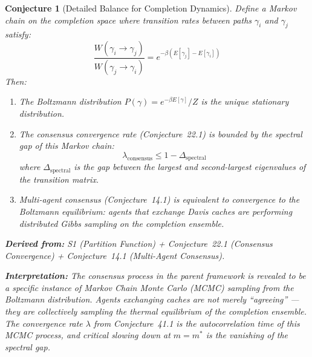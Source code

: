 \documentclass[11pt,letterpaper]{article}
\newtheorem{conjecture}{Conjecture}[section]
\begin{document}
\begin{conjecture}[Detailed Balance for Completion 
Dynamics]\label{conj:detailed_balance}
Define a Markov chain on the completion space where transition rates between 
paths $\gamma_i$ and $\gamma_j$ satisfy:
\begin{equation}\label{eq:detailed_balance}
    \frac{W(\gamma_i \to \gamma_j)}{W(\gamma_j \to \gamma_i)} 
    = e^{-\beta(E[\gamma_j] - E[\gamma_i])}
\end{equation}
Then:

\begin{enumerate}[label=(\alph*)]
    \item The Boltzmann distribution $P(\gamma) = e^{-\beta E[\gamma]} / Z$ 
    is the unique stationary distribution.
    
    \item The consensus convergence rate (Conjecture~22.1) is bounded by 
    the spectral gap of this Markov chain:
    \begin{equation}\label{eq:consensus_spectral}
        \lambda_{\mathrm{consensus}} \leq 1 - \Delta_{\mathrm{spectral}}
    \end{equation}
    where $\Delta_{\mathrm{spectral}}$ is the gap between the largest and 
    second-largest eigenvalues of the transition matrix.
    
    \item Multi-agent consensus (Conjecture~14.1) is equivalent to 
    convergence to the Boltzmann equilibrium: agents that exchange Davis 
    caches are performing distributed Gibbs sampling on the completion 
    ensemble.
\end{enumerate}

\textbf{Derived from:} S1 (Partition Function) + Conjecture~22.1 
(Consensus Convergence) + Conjecture~14.1 (Multi-Agent Consensus).

\textbf{Interpretation:} The consensus process in the parent framework 
is revealed to be a specific instance of Markov Chain Monte Carlo (MCMC) 
sampling from the Boltzmann distribution. Agents exchanging caches are not 
merely ``agreeing'' --- they are collectively sampling the thermal 
equilibrium of the completion ensemble. The convergence rate $\lambda$ from 
Conjecture~41.1 is the autocorrelation time of this MCMC process, and 
critical slowing down at $m = m^*$ is the vanishing of the spectral gap.
\end{conjecture}
\end{document}
